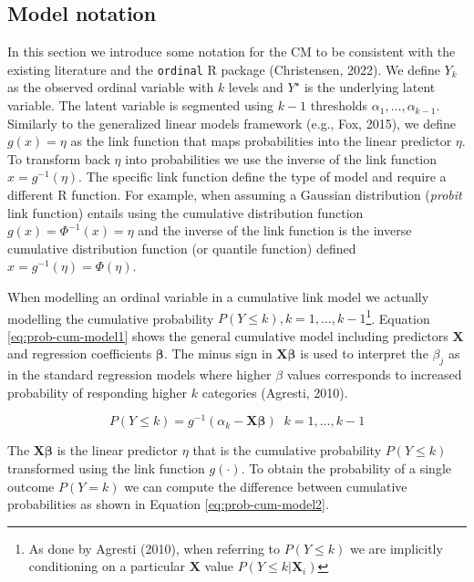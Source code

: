 \documentclass[
  man,floatsintext]{apa6}
\begin{document}
\subsection{Model notation}\label{model-notation}

In this section we introduce some notation for the CM to be consistent with the existing literature and the \texttt{ordinal} R package (Christensen, 2022). We define \(Y_k\) as the observed ordinal variable with \(k\) levels and \(Y^\star\) is the underlying latent variable. The latent variable is segmented using \(k - 1\) thresholds \(\alpha_1, \dots, \alpha_{k - 1}\). Similarly to the generalized linear models framework (e.g., Fox, 2015), we define \(g(x) = \eta\) as the link function that maps probabilities into the linear predictor \(\eta\). To transform back \(\eta\) into probabilities we use the inverse of the link function \(x = g^{-1}(\eta)\). The specific link function define the type of model and require a different R function. For example, when assuming a Gaussian distribution (\emph{probit} link function) entails using the cumulative distribution function \(g(x) = \Phi^{-1}(x) = \eta\) and the inverse of the link function is the inverse cumulative distribution function (or quantile function) defined \(x = g^{-1}(\eta) = \Phi(\eta)\).

When modelling an ordinal variable in a cumulative link model we actually modelling the cumulative probability \(P(Y \leq k), k = 1, \dots, k - 1\)\footnote{As done by Agresti (2010), when referring to \(P(Y \leq k)\) we are implicitly conditioning on a particular \(\mathbf{X}\) value \(P(Y \leq k | \mathbf{X}_i)\)}. Equation \eqref{eq:prob-cum-model1} shows the general cumulative model including predictors \(\mathbf{X}\) and regression coefficients \(\boldsymbol{\beta}\). The minus sign in \(\mathbf{X} \boldsymbol{\beta}\) is used to interpret the \(\beta_j\) as in the standard regression models where higher \(\beta\) values corresponds to increased probability of responding higher \(k\) categories (Agresti, 2010).

\begin{equation}
P(Y \leq k) = g^{-1}(\alpha_k - \mathbf{X} \boldsymbol{\beta}) \;\;k = 1, \dots, k - 1
\label{eq:prob-cum-model1}
\end{equation}

The \(\mathbf{X} \boldsymbol{\beta}\) is the linear predictor \(\eta\) that is the cumulative probability \(P(Y \leq k)\) transformed using the link function \(g(\cdot)\). To obtain the probability of a single outcome \(P(Y = k)\) we can compute the difference between cumulative probabilities as shown in Equation \eqref{eq:prob-cum-model2}.
\end{document}
